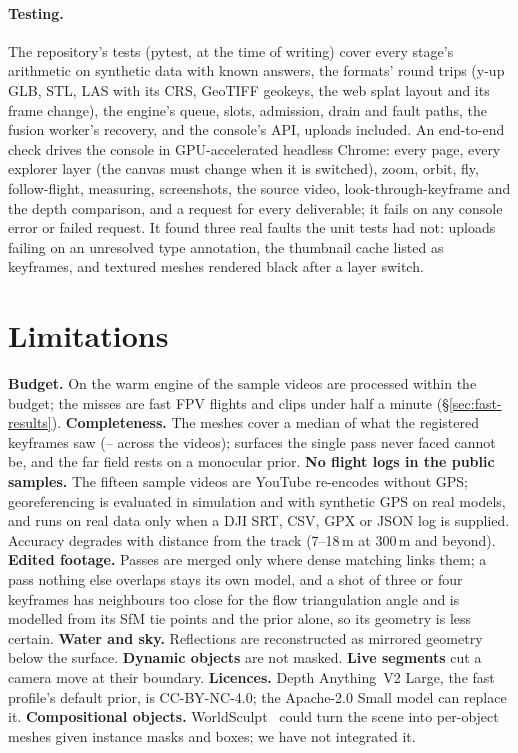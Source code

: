 \documentclass[10pt,a4paper,twocolumn]{article}
\begin{document}
\paragraph{Testing.} The repository's tests (pytest, \TestCount{} at the time of writing) cover every stage's arithmetic on synthetic data with known answers, the formats' round trips (y-up GLB, STL, LAS with its CRS, GeoTIFF geokeys, the web splat layout and its frame change), the engine's queue, slots, admission, drain and fault paths, the fusion worker's recovery, and the console's API, uploads included. An end-to-end check drives the console in GPU-accelerated headless Chrome: every page, every explorer layer (the canvas must change when it is switched), zoom, orbit, fly, follow-flight, measuring, screenshots, the source video, look-through-keyframe and the depth comparison, and a request for every deliverable; it fails on any console error or failed request. It found three real faults the unit tests had not: uploads failing on an unresolved type annotation, the thumbnail cache listed as keyframes, and textured meshes rendered black after a layer switch.



\FloatBarrier
\section{Limitations}\label{sec:limits}
\textbf{Budget.} On the warm engine \BenchWithin{} of the \BenchN{} sample videos are processed within the budget; the misses are fast FPV flights and clips under half a minute (\S\ref{sec:fast-results}). \textbf{Completeness.} The meshes cover a median \BenchComplMedian{} of what the registered keyframes saw (\BenchComplMin{}--\BenchComplMax{} across the videos); surfaces the single pass never faced cannot be, and the far field rests on a monocular prior. \textbf{No flight logs in the public samples.} The fifteen sample videos are YouTube re-encodes without GPS; georeferencing is evaluated in simulation and with synthetic GPS on real models, and runs on real data only when a DJI SRT, CSV, GPX or JSON log is supplied. Accuracy degrades with distance from the track (7--18\,m at 300\,m and beyond). \textbf{Edited footage.} Passes are merged only where dense matching links them; a pass nothing else overlaps stays its own model, and a shot of three or four keyframes has neighbours too close for the flow triangulation angle and is modelled from its SfM tie points and the prior alone, so its geometry is less certain. \textbf{Water and sky.} Reflections are reconstructed as mirrored geometry below the surface. \textbf{Dynamic objects} are not masked. \textbf{Live segments} cut a camera move at their boundary. \textbf{Licences.} Depth Anything~V2 Large, the fast profile's default prior, is CC-BY-NC-4.0; the Apache-2.0 Small model can replace it. \textbf{Compositional objects.} WorldSculpt~\cite{niu2026worldsculpt} could turn the scene into per-object meshes given instance masks and boxes; we have not integrated it.
\end{document}
